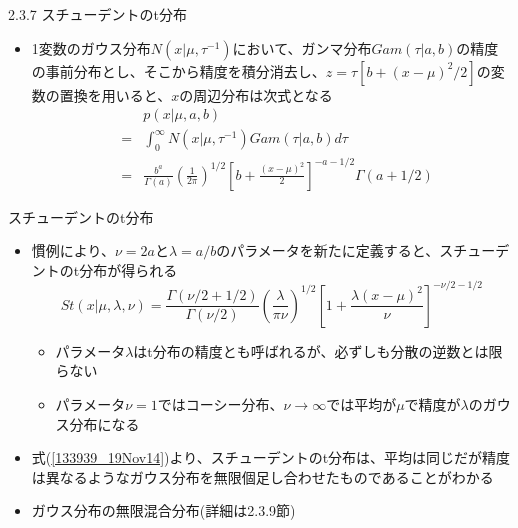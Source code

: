 \begin{frame}{2.3.7 スチューデントのt分布}
 \begin{itemize}
  \item 1変数のガウス分布$N(x|\mu, \tau^{-1})$において、ガンマ分布$Gam(\tau|a,b)$の精度の事前分布とし、そこから精度を積分消去し、$z=\tau[b+(x-\mu)^2/2]$の変数の置換を用いると、$x$の周辺分布は次式となる
        \begin{eqnarray}
         && p(x|\mu,a,b) \nonumber \\
         &=& \int_0^\infty N(x|\mu,\tau^{-1})Gam(\tau|a,b)d\tau\label{133939_19Nov14} \\
         &= & \frac{b^a}{\Gamma(a)}\left(\frac{1}{2\pi}\right)^{1/2}\left[b+\frac{(x-\mu)^2}{2}\right]^{-a-1/2}\Gamma(a+1/2)
        \end{eqnarray}
 \end{itemize}
\end{frame}

\begin{frame}{スチューデントのt分布}
 \begin{itemize}
  \item 慣例により、$\nu=2a$と$\lambda=a/b$のパラメータを新たに定義すると、\alert{スチューデントのt分布}が得られる
        \begin{equation}
         St(x|\mu,\lambda,\nu) = \frac{\Gamma(\nu/2+1/2)}{\Gamma(\nu/2)}\left(\frac{\lambda}{\pi\nu}\right)^{1/2}\left[1+\frac{\lambda(x-\mu)^2}{\nu}\right]^{-\nu/2-1/2}
        \end{equation}
        \begin{itemize}
         \item パラメータ$\lambda$はt分布の精度とも呼ばれるが、必ずしも分散の逆数とは限らない
         \item パラメータ$\nu=1$ではコーシー分布、$\nu\rightarrow\infty$では平均が$\mu$で精度が$\lambda$のガウス分布になる
        \end{itemize}
  \item 式(\ref{133939_19Nov14})より、スチューデントのt分布は、平均は同じだが精度は異なるようなガウス分布を無限個足し合わせたものであることがわかる
  \item ガウス分布の無限混合分布(詳細は2.3.9節)
 \end{itemize}
\end{frame}



